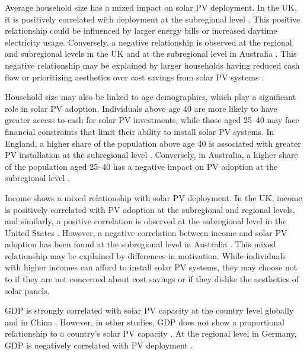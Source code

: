 Average household size has a mixed impact on solar PV deployment. In the UK, it is positively correlated with deployment at the subregional level \cite{collier_distributed_2023}. This positive relationship could be influenced by larger energy bills or increased daytime electricity usage. Conversely, a negative relationship is observed at the regional and subregional levels in the UK and at the subregional level in Australia \cite{balta-ozkan_regional_2015,alderete_peralta_spatio-temporal_2022,fuentes_solar_2024}. This negative relationship may be explained by larger households having reduced cash flow or prioritizing aesthetics over cost savings from solar PV systems \cite{balta-ozkan_regional_2015}.

Household size may also be linked to age demographics, which play a significant role in solar PV adoption. Individuals above age 40 are more likely to have greater access to cash for solar PV investments, while those aged 25–40 may face financial constraints that limit their ability to install solar PV systems. In England, a higher share of the population above age 40 is associated with greater PV installation at the subregional level \cite{laura_williams_identifying_2012}. Conversely, in Australia, a higher share of the population aged 25–40 has a negative impact on PV adoption at the subregional level \cite{fuentes_solar_2024}.

Income shows a mixed relationship with solar PV deployment. In the UK, income is positively correlated with PV adoption at the subregional and regional levels, and similarly, a positive correlation is observed at the subregional level in the United States \cite{alderete_peralta_spatio-temporal_2022,balta-ozkan_regional_2015,yu_deepsolar_2018}. However, a negative correlation between income and solar PV adoption has been found at the subregional level in Australia \cite{fuentes_solar_2024}. This mixed relationship may be explained by differences in motivation. While individuals with higher incomes can afford to install solar PV systems, they may choose not to if they are not concerned about cost savings or if they dislike the aesthetics of solar panels.

GDP is strongly correlated with solar PV capacity at the country level globally and in China \cite{alghanem_global_2024,liu_forecasting_2022}. However, in other studies, GDP does not show a proportional relationship to a country's solar PV capacity \cite{celik_review_2020}. At the regional level in Germany, GDP is negatively correlated with PV deployment \cite{mayer_deepsolar_2020}.

